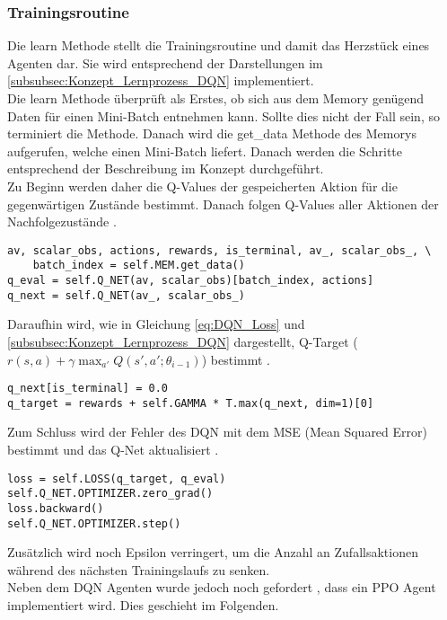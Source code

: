 \subsubsection{Trainingsroutine} \label{subsubsec:Implementierung_Trainingsroutine_DQN}
Die learn Methode stellt die Trainingsroutine und damit das Herzstück eines Agenten dar. Sie wird entsprechend der Darstellungen im \autoref{subsubsec:Konzept_Lernprozess_DQN} implementiert.\\
Die learn Methode überprüft als Erstes, ob sich aus dem Memory genügend Daten für einen Mini-Batch entnehmen kann. Sollte dies nicht der Fall sein, so terminiert die Methode.
Danach wird die get\_data Methode des Memorys aufgerufen, welche einen Mini-Batch liefert. Danach werden die Schritte entsprechend der Beschreibung im Konzept  durchgeführt.\\
Zu Beginn werden daher die Q-Values der gespeicherten Aktion für die gegenwärtigen Zustände bestimmt. Danach folgen Q-Values aller Aktionen der Nachfolgezustände .
\newpage
\begin{lstlisting}[caption=Bestimmung der Q-Values, label=code:Bestimmung_Q-Values, style=Python]
av, scalar_obs, actions, rewards, is_terminal, av_, scalar_obs_, \
	batch_index = self.MEM.get_data()
q_eval = self.Q_NET(av, scalar_obs)[batch_index, actions]
q_next = self.Q_NET(av_, scalar_obs_)
\end{lstlisting}
Daraufhin wird, wie in Gleichung \ref{eq:DQN_Loss} und \autoref{subsubsec:Konzept_Lernprozess_DQN} dargestellt, Q-Target ($r(s,a) +\gamma \max_{a'}Q(s',a';\theta_{i-1})$) bestimmt .
\begin{lstlisting}[caption=Bestimmung von Q-Target, label=code:Bestimmung_Q-Target, style=Python]
q_next[is_terminal] = 0.0
q_target = rewards + self.GAMMA * T.max(q_next, dim=1)[0]
\end{lstlisting}
Zum Schluss wird der Fehler des DQN mit dem MSE (Mean Squared Error) bestimmt und das Q-Net aktualisiert .
\begin{lstlisting}[caption=Bestimmung des DQN Loss \& Update des Q-Networks, label=code:Bestimmung_DQN-Loss, style=Python]
loss = self.LOSS(q_target, q_eval)
self.Q_NET.OPTIMIZER.zero_grad()
loss.backward()
self.Q_NET.OPTIMIZER.step()
\end{lstlisting}
Zusätzlich wird noch Epsilon verringert, um die Anzahl an Zufallsaktionen während des nächsten Trainingslaufs zu senken.\\
Neben dem DQN Agenten wurde jedoch noch gefordert \fullref{subsec:Anforderungen_Diversität}, dass ein PPO Agent implementiert wird. Dies geschieht im Folgenden.

